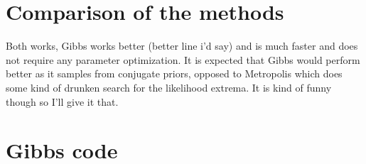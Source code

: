 \documentclass[12pt]{article}
\begin{document}
\section{Comparison of the methods}
Both works, Gibbs works better (better line i'd say) and is much faster and does not require any parameter optimization. It is expected that Gibbs would perform better as it samples from conjugate priors, opposed to Metropolis which does some kind of drunken search for the likelihood extrema. It is kind of funny though so I'll give it that. 

\appendix
\section{Gibbs code}

% 
% 
% 
\end{document}
